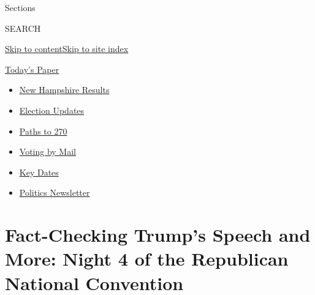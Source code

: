 Sections

SEARCH

\protect\hyperlink{site-content}{Skip to
content}\protect\hyperlink{site-index}{Skip to site index}

\href{https://myaccount.nytimes3xbfgragh.onion/auth/login?response_type=cookie\&client_id=vi}{}

\href{https://www.nytimes3xbfgragh.onion/section/todayspaper}{Today's
Paper}

\begin{itemize}
\item
  \href{https://www.nytimes3xbfgragh.onion/interactive/2020/09/08/us/elections/results-new-hampshire-primary-elections.html?action=click\&pgtype=Article\&state=default\&region=TOP_BANNER\&context=storylines_menu}{New
  Hampshire Results}
\item
  \href{https://www.nytimes3xbfgragh.onion/live/2020/09/08/us/trump-vs-biden?action=click\&pgtype=Article\&state=default\&region=TOP_BANNER\&context=storylines_menu}{Election
  Updates}
\item
  \href{https://www.nytimes3xbfgragh.onion/interactive/2020/us/elections/election-states-biden-trump.html?action=click\&pgtype=Article\&state=default\&region=TOP_BANNER\&context=storylines_menu}{Paths
  to 270}
\item
  \href{https://www.nytimes3xbfgragh.onion/interactive/2020/08/31/us/politics/vote-by-mail-deadlines.html?action=click\&pgtype=Article\&state=default\&region=TOP_BANNER\&context=storylines_menu}{Voting
  by Mail}
\item
  \href{https://www.nytimes3xbfgragh.onion/interactive/2019/us/elections/2020-presidential-election-calendar.html?action=click\&pgtype=Article\&state=default\&region=TOP_BANNER\&context=storylines_menu}{Key
  Dates}
\item
  \href{https://www.nytimes3xbfgragh.onion/newsletters/politics?action=click\&pgtype=Article\&state=default\&region=TOP_BANNER\&context=storylines_menu}{Politics
  Newsletter}
\end{itemize}

\hypertarget{fact-checking-trumps-speech-and-more-night-4-of-the-republican-national-convention}{%
\section{Fact-Checking Trump's Speech and More: Night 4 of the
Republican National
Convention}\label{fact-checking-trumps-speech-and-more-night-4-of-the-republican-national-convention}}


